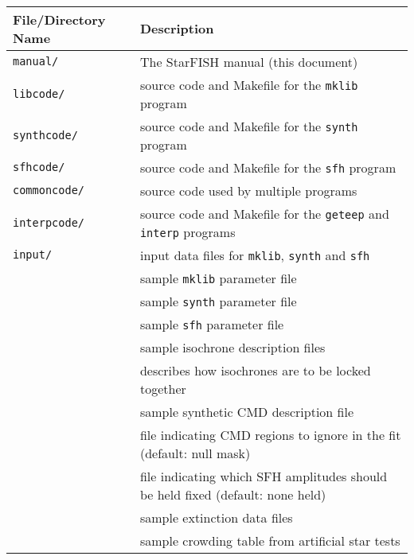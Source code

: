 \documentclass[12pt]{book}
\def\ttg{\tt\color{DarkGreen}}
\begin{document}
\bigskip
{}\\
{\scriptsize
\begin{tabular}{|l|l|}
\hline
{\bf File/Directory Name}  & {\bf Description} \\ 
\hline
{\ttg manual/}     & The StarFISH manual (this document)\\
{\ttg libcode/}    & source code and Makefile for the {\ttg mklib} program\\
{\ttg synthcode/}  & source code and Makefile for the {\ttg synth} program\\
{\ttg sfhcode/}    & source code and Makefile for the {\ttg sfh} program\\
{\ttg commoncode/} & source code used by multiple programs\\
{\ttg interpcode/} & source code and Makefile for the {\ttg geteep} and {\ttg interp} programs\\
{\ttg input/}      & input data files for {\ttg mklib}, {\ttg synth} and {\ttg sfh}\\
\hspace{20pt}{\ttg /lib.dat}   & sample {\ttg mklib} parameter file\\
\hspace{20pt}{\ttg /synth.dat} & sample {\ttg synth} parameter file\\
\hspace{20pt}{\ttg /sfh.dat}   & sample {\ttg sfh} parameter file\\
\hspace{20pt}{\ttg /iso.dat}   & sample isochrone description files\\
\hspace{20pt}{\ttg /iso.lock}  & describes how isochrones are to be locked together\\
\hspace{20pt}{\ttg /test.cmds} & sample synthetic CMD description file\\
\hspace{20pt}{\ttg /mask.none} & file indicating CMD regions to ignore in the fit (default: null mask)\\
\hspace{20pt}{\ttg /test.hold} & file indicating which SFH amplitudes should be held fixed (default: none held)\\
\hspace{20pt}{\ttg /av/*.av}   & sample extinction data files\\
\hspace{20pt}{\ttg /crowd/*.crowd} & sample crowding table from artificial star tests\\

\end{tabular}}
\end{document}
